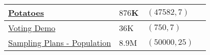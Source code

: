 \begin{customArrayStretch}{1.3}
\begin{longtable}{
    |
    >{\RaggedRight\arraybackslash}p{5cm}| %
    >{\hfill}p{2.5cm}| %
    >{\hfill}p{3cm}| %
    >{\hfill}p{2cm}| %
}
\href{https://drive.google.com/file/d/1GYUk0i9penKnSWODDkZfMzNxK2FUxDi8/view?usp=drive_link}{Potatoes} \label{Datasets/nth-iteration/potatoes} &
$876$K &
$(47582, 7)$ &
\cite{statistics/book/Statistics-for-Data-Scientists/Maurits-Kaptein} \\ \hline

\href{http://www.nth-iteration.com/wp-content/uploads/2018/08/voting_demo.csv}{Voting Demo} \label{Datasets/nth-iteration/voting_demo} &
$36$K &
$(750, 7)$ &
\cite{statistics/book/Statistics-for-Data-Scientists/Maurits-Kaptein} \\ \hline



\href{https://drive.google.com/file/d/1DKQnolgdVxQddQAp1haafo0AqvFVT5yj/view?usp=drive_link}{Sampling Plans - Population}  &
$8.9$M &
$(50000, 25)$ &
\cite{common/online/chatgpt} \\ \hline







\end{longtable}
\end{customArrayStretch}


